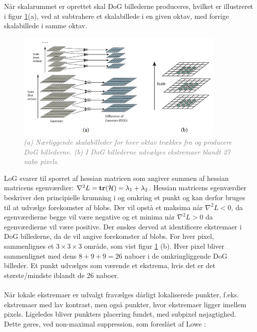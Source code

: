 Når skalarummet er oprettet skal DoG billederne produceres, hvilket er illustreret i figur \ref{fig:difference}(a), ved at subtrahere et skalabillede i en given oktav, med forrige skalabillede i samme oktav.
\begin{figure}[H]
    \centering
    \includegraphics[width=0.90\textwidth]{fig/30.png}
     \vspace{-1em}
    \begin{center}    
       \caption{\textcolor{gray}{\footnotesize \textit{(a) Nærliggende skalabilleder for hver oktav trækkes fra og producere DoG billederne. (b) I DoG billederne udvælges ekstremaer blandt 27 nabo pixels.}}}
    \label{fig:difference}
     \end{center}
     \vspace{-2.5em}
  \end{figure} \noindent
LoG svarer til sporret af hessian matricen som angiver summen af hessian matricens egenværdier: $\nabla^2 L=\bold{tr}( \mathcal{H} )=\lambda_1+\lambda_2$. Hessian matricens egenværdier beskriver den principielle krumning i og omkring et punkt og kan derfor bruges til at udvælge forekomster af blobs. Der vil opstå et maksima når  $\nabla^2 L<0$, da egenværdierne begge vil være negative og et minima når $\nabla^2 L > 0$ da egenværdierne vil være positive. Der ønskes derved at identificere ekstremaer i DoG billederne, da de vil angive forekomster af blobs. For hver pixel, sammenlignes et $3\times3\times3$ område, som vist figur \ref{fig:difference} (b). Hver pixel bliver sammenlignet med dens $8+9+9=26$ naboer i de omkringliggende DoG billeder. Et punkt udvælges som værende et ekstrema, hvis det er det største/mindste iblandt de 26 naboer.
\\
\\
Når lokale ekstremaer er udvalgt fravælges dårligt lokaliserede punkter, f.eks. ekstremaer med lav kontrast, men også punkter, hvor ekstremaer ligger imellem pixels. Ligeledes bliver punkters placering fundet, med subpixel nøjagtighed. Dette gøres, ved non-maximal suppression, som foreslået af Lowe \cite{nonmaximalsuppression}:
